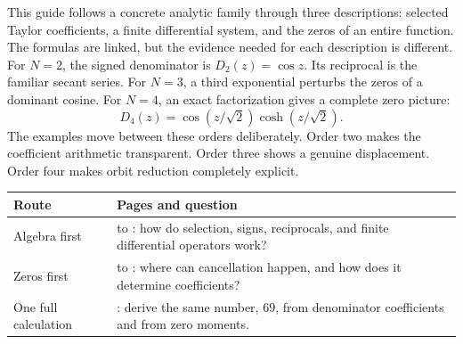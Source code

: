 This guide follows a concrete analytic family through three descriptions: selected Taylor coefficients, a finite differential system, and the zeros of an entire function. The formulas are linked, but the evidence needed for each description is different.
For $N=2$, the signed denominator is $D_2(z)=\cos z$. Its reciprocal is the familiar secant series. For $N=3$, a third exponential perturbs the zeros of a dominant cosine. For $N=4$, an exact factorization gives a complete zero picture:
\[
D_4(z)=\cos(z/\sqrt2)\cosh(z/\sqrt2).
\]
The examples move between these orders deliberately. Order two makes the coefficient arithmetic transparent. Order three shows a genuine displacement. Order four makes orbit reduction completely explicit.
\par\noindent\begin{tabularx}{\linewidth}{@{}lY@{}}\toprule
Route & Pages and question\\\midrule
Algebra first &  to : how do selection, signs, reciprocals, and finite differential operators work?\\
Zeros first &  to : where can cancellation happen, and how does it determine coefficients?\\
One full calculation & : derive the same number, $69$, from denominator coefficients and from zero moments.\\\bottomrule
\end{tabularx}

